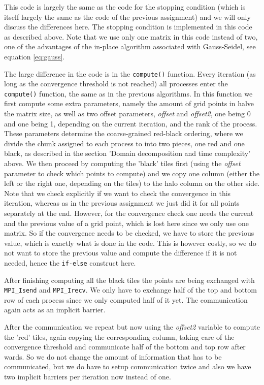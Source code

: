 \documentclass[11pt,a4paper,onecolumn]{article}
\begin{document}
This code is largely the same as the code for the stopping condition (which is itself largely the same as the code of the previous assignment) and we will only discuss the differences here. The stopping condition is implemented in this code as described above. Note that we use only one matrix in this code instead of two, one of the advantages of the in-place algorithm associated with Gauss-Seidel, see equation \ref{eq:gauss}. 

The large difference in the code is in the \texttt{compute()} function. Every iteration (as long as the convergence threshold is not reached) all processes enter the \texttt{compute()} function, the same as in the previous algorithms. In this function we first compute some extra parameters, namely the amount of grid points in halve the matrix size, as well as two offset parameters, \emph{offset} and \emph{offset2}, one being 0 and one being 1, depending on the current iteration, and the rank of the process. These parameters determine the coarse-grained red-black ordering, where we divide the chunk assigned to each process to into two pieces, one red and one black, as described in the section 'Domain decomposition and time complexity' above. We then proceed by computing the 'black' tiles first (using the \emph{offset} parameter to check which points to compute) and we copy one column (either the left or the right one, depending on the tiles) to the halo column on the other side. Note that we check explicitly if we want to check the convergence in this iteration, whereas as in the previous assignment we just did it for all points separately at the end. However, for the convergence check one needs the current and the previous value of a grid point, which is lost here since we only use one matrix. So if the convergence needs to be checked, we have to store the previous value, which is exactly what is done in the code. This is however costly, so we do not want to store the previous value and compute the difference if it is not needed, hence the \texttt{if-else} construct here.

After finishing computing all the black tiles the points are being exchanged with \texttt{MPI\_Isend} and \texttt{MPI\_Irecv}. We only have to exchange half of the top and bottom row of each process since we only computed half of it yet. The communication again acts as an implicit barrier.

After the communication we repeat but now using the \emph{offset2} variable to compute the 'red' tiles, again copying the corresponding column, taking care of the convergence threshold and communicate half of the bottom and top row after wards. So we do not change the amount of information that has to be communicated, but we do have to setup communication twice and also we have two implicit barriers per iteration now instead of one.
\end{document}
